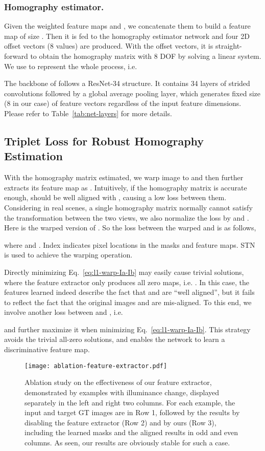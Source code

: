 \documentclass[runningheads]{llncs}
\begin{document}
\subsubsection{Homography estimator.}
Given the weighted feature maps  and , we concatenate them to build a feature map  of size . Then it is fed to the homography estimator network and four 2D offset vectors (8 values) are produced. With the  offset vectors, it is straight-forward to obtain the homography matrix  with 8 DOF by solving a linear system. We use  to represent the whole process, i.e.

The backbone of  follows a ResNet-34 structure. It contains 34 layers of strided convolutions followed by a global average pooling layer, which generates fixed size (8 in our case) of feature vectors regardless of the input feature dimensions. Please refer to Table~\ref{tab:net-layers} for more details. 

\subsection{Triplet Loss for Robust Homography Estimation}\label{subsec:triplet-loss}With the homography matrix  estimated, we warp image  to  and then further extracts its feature map as . Intuitively, if the homography matrix  is accurate enough,  should be well aligned with , causing a low  loss between them. Considering in real scenes, a single homography matrix normally cannot satisfy the transformation between the two views, we also normalize the  loss by  and . Here  is the warped version of . So the loss between the warped  and  is as follows,

where  and . Index  indicates pixel locations in the masks and feature maps. STN~\cite{jaderberg2015spatial} is used to achieve the warping operation.

Directly minimizing Eq.~\ref{eq:l1-warp-Ia-Ib} may easily cause trivial solutions, where the feature extractor only produces all zero maps, i.e. . In this case, the features learned indeed describe the fact that  and  are ``well aligned'', but it fails to reflect the fact that the original images  and  are mis-aligned. To this end, we involve another loss between  and , i.e.

and further maximize it when minimizing Eq.~\ref{eq:l1-warp-Ia-Ib}. This strategy avoids the trivial all-zero solutions, and enables the network to learn a discriminative feature map.

\begin{figure*}[t]
  \centering
  \texttt{[image: ablation-feature-extractor.pdf]}\caption{Ablation study on the effectiveness of our feature extractor, demonstrated by examples with illuminance change, displayed separately in the left and right two columns. For each example, the input and target GT images are in Row 1, followed by the results by disabling the feature extractor  (Row 2) and by ours (Row 3), including the learned masks and the aligned results in odd and even columns. As seen, our results are obviously stable for such a case.}
  \label{fig:ablation-feat-ext}
\end{figure*}
\end{document}
